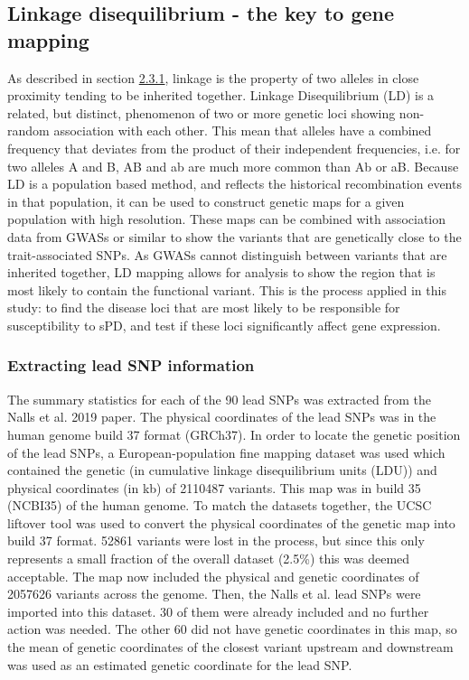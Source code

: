 \documentclass{article}
\begin{document}
\subsection{Linkage disequilibrium - the key to gene mapping}
As described in section \hyperref[subsubsec:linkage]{2.3.1}, linkage is the property of two alleles in close proximity tending to be inherited together. Linkage Disequilibrium (LD) is a related, but distinct, phenomenon of two or more genetic loci showing non-random association with each other\cite{Slatkin2008LinkageFuture}. This mean that  alleles have a combined frequency that deviates from the product of their independent frequencies, i.e. for two alleles A and B, AB and ab are much more common than Ab or aB. Because LD is a population based method, and reflects the historical recombination events in that population, it can be used to construct genetic maps for a given population with high resolution. These maps can be combined with association data from GWASs or similar to show the variants that are genetically close to the trait-associated SNPs. As GWASs cannot distinguish between variants that are inherited together, LD mapping allows for analysis to show the region that is most likely to contain the functional variant\cite{Hutchinson2020Fine-mappingAssociations}. This is the process applied in this study: to find the disease loci that are most likely to be responsible for susceptibility to sPD, and test if these loci significantly affect gene expression.

\subsubsection{Extracting lead SNP information}
The summary statistics for each of the 90 lead SNPs was extracted from the Nalls et al. 2019 paper\cite{Nalls2019IdentificationStudies}. The physical coordinates of the lead SNPs was in the human genome build 37 format (GRCh37). In order to locate the genetic position of the lead SNPs, a European-population fine mapping dataset was used\cite{Maniatis2004PositionalDisequilibrium.} which contained the genetic (in cumulative linkage disequilibrium units (LDU)) and physical coordinates (in kb) of 2110487 variants. This map was in build 35 (NCBI35) of the human genome. To match the datasets together, the UCSC liftover tool\cite{Hinrichs2006The2006.} was used to convert the physical coordinates of the genetic map into build 37 format. 52861 variants were lost in the process, but since this only represents a small fraction of the overall dataset (2.5\%) this was deemed acceptable. The map now included the physical and genetic coordinates of 2057626 variants across the genome. Then, the Nalls et al.\cite{Nalls2019IdentificationStudies} lead SNPs were imported into this dataset. 30 of them were already included and no further action was needed. The other 60 did not have genetic coordinates in this map, so the mean of genetic coordinates of the closest variant upstream and downstream was used as an estimated genetic coordinate for the lead SNP.
\end{document}
